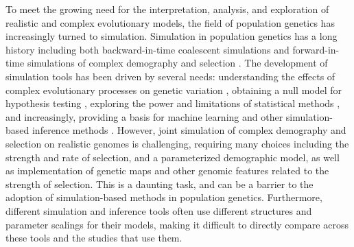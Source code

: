 \documentclass[hidelinks]{article}
\begin{document}
    To meet the growing need for the interpretation,
    analysis, and exploration of realistic and complex evolutionary models,
    the field of population genetics has increasingly turned to simulation.
    Simulation in population genetics has a long history
    including both backward-in-time coalescent simulations
    \citep{kingman1982genealogy,hudson1983testing, hudson1990gene}
    and forward-in-time simulations of complex demography and selection
    \citep[e.g.,][]{gillespie1984molecular, hernandez2008flexible, thornton2014c++, haller2019slim, gaynor2021AlphaSimR}.
    The development of simulation tools has been driven by several needs:
    understanding the effects of complex evolutionary processes on genetic
    variation \citep[e.g.,][]{peischl2013accumulation, thornton2019polygenic, galloway2020few, zhang2020impact},
    obtaining a null model for hypothesis testing
    \citep[e.g.,][]{hudson1992statistical,hudson1994evidence,sabeti2002detecting},
    exploring the power and limitations of statistical methods \citep[e.g.,][]{przeworski2002signature, macleod2014effects},
    and increasingly, providing a basis for machine learning and other
    simulation-based inference methods
    \citep[e.g.,][]{beaumont2002approximate,lin2011distinguishing,kern2018diplos,mughal2019localizing,sanchez2021deep,wang2021automatic, zhang2023maladapt, smith2023dispersenn2}.
    However, joint simulation of complex demography and selection on realistic genomes is challenging,
    requiring many choices including the strength and rate of selection,
    and a parameterized demographic model,
    as well as implementation of genetic maps and other genomic features related to the strength of selection.
    This is a daunting task, and can be a barrier to
    the adoption of simulation-based methods in population genetics.
    Furthermore, different simulation and inference tools often use different structures
    and parameter scalings for their models,
    making it difficult to directly compare across these tools and the studies that use them.
\end{document}
